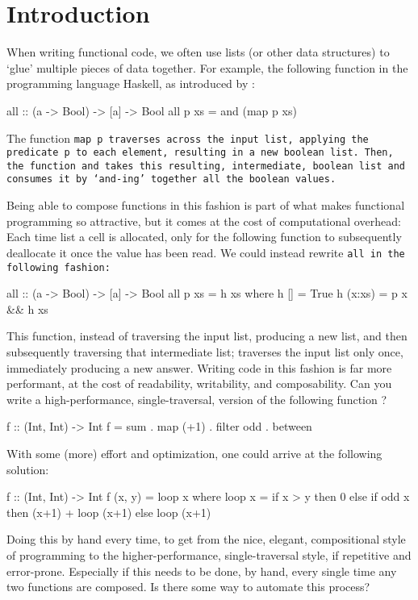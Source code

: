 \section{Introduction}
When writing functional code, we often use lists (or other data structures) to `glue' multiple pieces of data together.
For example, the following function in the programming language Haskell, as introduced by \cite{Gill1993}:
\begin{code}
all :: (a -> Bool) -> [a] -> Bool
all p xs = and (map p xs)
\end{code}
The function \tt{map p} traverses across the input list, applying the predicate \tt{p} to each element, resulting in a new boolean list.
Then, the function \tt{and} takes this resulting, intermediate, boolean list and consumes it by `and-ing' together all the boolean values.

Being able to compose functions in this fashion is part of what makes functional programming so attractive, but it comes at the cost of computational overhead:
Each time list a cell is allocated, only for the following function to subsequently deallocate it once the value has been read.
We could instead rewrite \tt{all} in the following fashion:
\begin{code}
all :: (a -> Bool) -> [a] -> Bool
all p xs = h xs
  where h []     = True
        h (x:xs) = p x && h xs
\end{code}
This function, instead of traversing the input list, producing a new list, and then subsequently traversing that intermediate list; traverses the input list only once, immediately producing a new answer.
Writing code in this fashion is far more performant, at the cost of readability, writability, and composability.
Can you write a high-performance, single-traversal, version of the following function \citep{Harper2011}?
\begin{code}
f :: (Int, Int) -> Int
f = sum . map (+1) . filter odd . between
\end{code}
With some (more) effort and optimization, one could arrive at the following solution:
\begin{code}
f :: (Int, Int) -> Int
f (x, y) = loop x
  where loop x = if x > y
                 then 0
                 else if odd x
                      then (x+1) + loop (x+1)
                      else loop (x+1)
\end{code}
Doing this by hand every time, to get from the nice, elegant, compositional style of programming to the higher-performance, single-traversal style, if repetitive and error-prone.
Especially if this needs to be done, by hand, every single time any two functions are composed.
Is there some way to automate this process?

